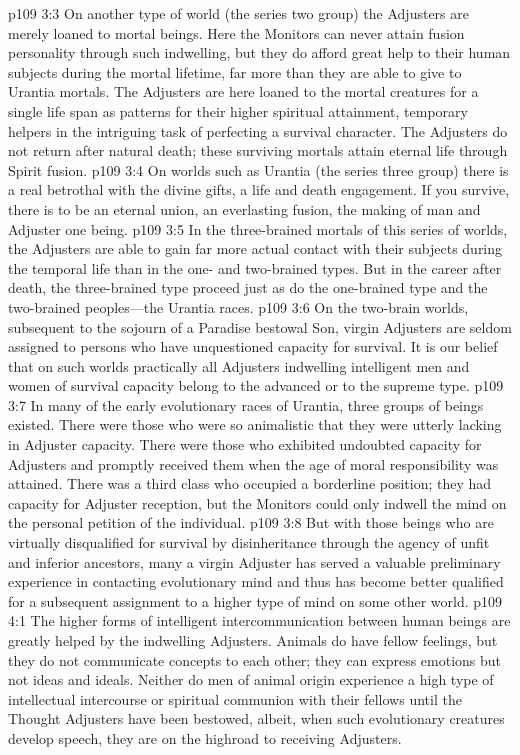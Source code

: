 \vs p109 3:3 On another type of world (the series two group) the Adjusters are merely loaned to mortal beings. Here the Monitors can never attain fusion personality through such indwelling, but they do afford great help to their human subjects during the mortal lifetime, far more than they are able to give to Urantia mortals. The Adjusters are here loaned to the mortal creatures for a single life span as patterns for their higher spiritual attainment, temporary helpers in the intriguing task of perfecting a survival character. The Adjusters do not return after natural death; these surviving mortals attain eternal life through Spirit fusion.
\vs p109 3:4 On worlds such as Urantia (the series three group) there is a real betrothal with the divine gifts, a life and death engagement. If you survive, there is to be an eternal union, an everlasting fusion, the making of man and Adjuster one being.
\vs p109 3:5 In the three\hyp{}brained mortals of this series of worlds, the Adjusters are able to gain far more actual contact with their subjects during the temporal life than in the one\hyp{} and two\hyp{}brained types. But in the career after death, the three\hyp{}brained type proceed just as do the one\hyp{}brained type and the two\hyp{}brained peoples---the Urantia races.
\vs p109 3:6 On the two\hyp{}brain worlds, subsequent to the sojourn of a Paradise bestowal Son, virgin Adjusters are seldom assigned to persons who have unquestioned capacity for survival. It is our belief that on such worlds practically all Adjusters indwelling intelligent men and women of survival capacity belong to the advanced or to the supreme type.
\pc \vs p109 3:7 In many of the early evolutionary races of Urantia, three groups of beings existed. There were those who were so animalistic that they were utterly lacking in Adjuster capacity. There were those who exhibited undoubted capacity for Adjusters and promptly received them when the age of moral responsibility was attained. There was a third class who occupied a borderline position; they had capacity for Adjuster reception, but the Monitors could only indwell the mind on the personal petition of the individual.
\vs p109 3:8 But with those beings who are virtually disqualified for survival by disinheritance through the agency of unfit and inferior ancestors, many a virgin Adjuster has served a valuable preliminary experience in contacting evolutionary mind and thus has become better qualified for a subsequent assignment to a higher type of mind on some other world.\plusone
{}
\vs p109 4:1 The higher forms of intelligent intercommunication between human beings are greatly helped by the indwelling Adjusters. Animals do have fellow feelings, but they do not communicate concepts to each other; they can express emotions but not ideas and ideals. Neither do men of animal origin experience a high type of intellectual intercourse or spiritual communion with their fellows until the Thought Adjusters have been bestowed, albeit, when such evolutionary creatures develop speech, they are on the highroad to receiving Adjusters.
